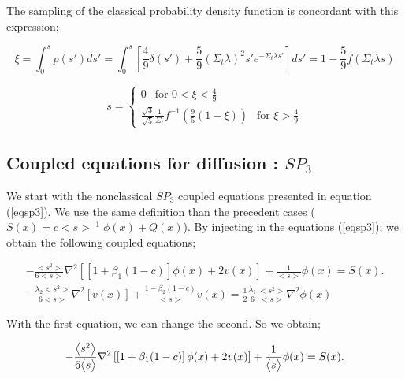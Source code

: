 \documentclass[a4paper, 12pt]{report}
\newcommand{\bl}{\big<}
\newcommand{\bg}{\big>}
\begin{document}
The sampling of the classical probability density function is concordant with this expression;

\begin{equation}
\xi = \int_0^s p(s')ds' = \int_0^s \left[ \frac{4}{9}\delta(s') + \frac{5}{9}(\Sigma_t \lambda)^2s'e^{-\Sigma_t \lambda s'} \right]ds' = 1 - \frac{5}{9}f(\Sigma_t \lambda s)
\end{equation}

\begin{center}
\begin{equation}
s = \begin{cases}
 0  \ \ \text{ for } 0 < \xi < \frac{4}{9} \\ 
 \frac{\sqrt{3}}{\sqrt{5}}\frac{1}{\Sigma_t}f^{-1}\left(\frac{9}{5}(1-\xi)\right) \ \ \text{ for }  \xi > \frac{4}{9} 
\end{cases}
\end{equation}
\end{center}



\subsection{Coupled equations for diffusion : $SP_3$}

We start with the nonclassical $SP_3$ coupled equations presented in equation (\ref{eqsp3}).
We use the same definition than the precedent cases ($S(x) = c\bl s \bg^{-1} \phi(x) + Q(x)$).
By injecting in the equations (\ref{eqsp3}); we obtain the following coupled equations;

\begin{align}
-\frac{\bl s^2 \bg}{6\bl s \bg} \nabla^2 \left[\left[1+\beta_1(1-c)\right]\phi(x)+ 2v(x)\right] + \frac{1}{\bl s \bg} \phi(x) = S(x). \\
-\frac{\lambda_2 \bl s^2 \bg}{6\bl s \bg} \nabla^2 \left[v(x)\right] + \frac{1-\beta_2(1-c)}{\bl s \bg} v(x) = \frac{1}{2}\frac{\lambda_1}{6}\frac{\bl s^2 \bg}{\bl s \bg} \nabla^2 \phi(x)
\end{align}

With the first equation, we can change the second. So we obtain;

\begin{equation}
-\frac{\bl s^2 \bg}{6\bl s \bg} \nabla^2 \left[\left[1+\beta_1(1-c)\right]\phi(x)+ 2v(x)\right] + \frac{1}{\bl s \bg} \phi(x) = S(x). \\
\end{equation}
\end{document}
